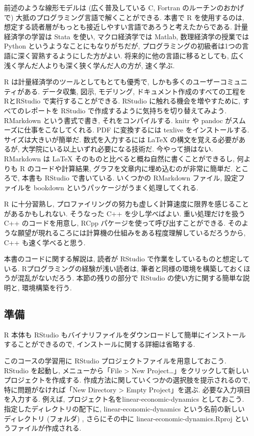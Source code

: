 \documentclass[a4paper]{scrbook}
\theoremstyle{definition}
\begin{document}
前述のような線形モデルは (広く普及している C, Fortran
のルーチンのおかげで) 大抵のプログラミング言語で解くことができる. 本書で
R を使用するのは,
想定する読者層がもっとも接近しやすい言語であろうと考えたからである.
計量経済学の学習は Stata を使い, マクロ経済学では Matlab,
数理経済学の授業では Python というようなことにもなりがちだが,
プログラミングの初級者は1つの言語に深く習熟するようにした方がよい.
将来的に他の言語に移るとしても,
広く浅く学んだ人よりも深く狭く学んだ人の方が, 速く学ぶ.

R は計量経済学のツールとしてもとても優秀で,
しかも多くのユーザーコミュニティがある. データ収集, 図示, モデリング,
ドキュメント作成のすべての工程をRとRStudio で実行することができる.
RStudio に触れる機会を増やすために, すべてのレポートを RStudio
で作成するように気持ちを切り替えてみよう. RMarkdown という書式で書き,
それをコンパイルする. knitr や pandoc がスムーズに仕事をこなしてくれる.
PDF に変換するには texlive をインストールする. サイズは大きいが簡単だ.
数式を入力するには LaTeX の構文を覚える必要があるが,
大学院にいる以上いずれ必要になる技術だ. 今やって損はない. RMarkdown は
LaTeX そのものと比べると概ね自然に書くことができるし, 何よりも R
のコードや計算結果, グラフを文章内に埋め込むのが非常に簡単だ. ところで,
本書も RStudio で書いている. いくつかの RMarkdown ファイル,
設定ファイルを bookdown というパッケージがうまく処理してくれる.

R に十分習熟し,
プロファイリングの努力も虚しく計算速度に限界を感じることがあるかもしれない.
そうなった C++ を少し学べばよい. 重い処理だけを扱う C++
のコードを用意し, RCpp パケージを使って呼び出すことができる.
そのような願望が現れるころには計算機の仕組みをある程度理解しているだろうから,
C++ も速く学べると思う.

本書のコードに関する解説は, 読者が RStudio
で作業をしているものと想定している. Rプログラミングの経験が浅い読者は,
筆者と同様の環境を構築しておくほうが混乱がないだろう. 本節の残りの部分で
RStudio の使い方に関する簡単な説明と, 環境構築を行う.

\subsection{準備}

R 本体も RStudio
もバイナリファイルをダウンロードして簡単にインストールすることができるので,
インストールに関する詳細は省略する.

このコースの学習用に RStudio プロジェクトファイルを用意しておこう.
RStudio を起動し, メニューから「File \textgreater{} New
Project\ldots{}」をクリックして新しいプロジェクトを作成する.
作成方法に関していくつかの選択肢を提示されるので,
特に問題がなければ「New Directory \textgreater{} Empty Project」を選ぶ.
必要な入力項目を入力する. 例えば,
プロジェクト名をlinear-economic-dynamics としておこう.
指定したディレクトリの配下に, linear-economic-dynamics
という名前の新しいディレクトリ (フォルダ) , さらにその中に
linear-economic-dynamics.Rproj というファイルが作成される.
\end{document}
